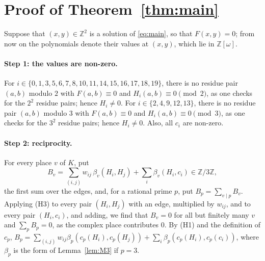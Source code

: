 \documentclass[11pt]{article}
\newcommand{\Z}{\mathbb{Z}}
\begin{document}
\section{Proof of Theorem~\ref{thm:main}}

Suppose that $(x,y)\in\Z^2$ is a solution of \eqref{eq:main}, so that $F(x,y)=0$; from now on the polynomials denote their values at $(x,y)$, which lie in $\Z[\omega]$.
\paragraph{Step 1: the values are non-zero.} For $i\in\{0,\allowbreak 1,\allowbreak 3,\allowbreak 5,\allowbreak 6,\allowbreak 7,\allowbreak 8,\allowbreak 10,\allowbreak 11,\allowbreak 14,\allowbreak 15,\allowbreak 16,\allowbreak 17,\allowbreak 18,\allowbreak 19\}$, there is no residue pair $(a,b)$ modulo $2$ with $F(a,b)\equiv0$ and $H_i(a,b)\equiv0\pmod{2}$, as one checks for the $2^2$ residue pairs; hence $H_i\neq0$. For $i\in\{2,\allowbreak 4,\allowbreak 9,\allowbreak 12,\allowbreak 13\}$, there is no residue pair $(a,b)$ modulo $3$ with $F(a,b)\equiv0$ and $H_i(a,b)\equiv0\pmod{3}$, as one checks for the $3^2$ residue pairs; hence $H_i\neq0$. Also, all $c_i$ are non-zero.

\paragraph{Step 2: reciprocity.} For every place $v$ of $K$, put
\begin{equation}\label{eq:B}
B_v=\sum_{(i,j)}w_{ij}\,\beta_v(H_i,H_j)+\sum_i\beta_v(H_i,c_i)\in\Z/3\Z,
\end{equation}
the first sum over the edges, and, for a rational prime $p$, put $B_p=\sum_{v\mid p}B_v$. Applying (H3) to every pair $(H_i,H_j)$ with an edge, multiplied by $w_{ij}$, and to every pair $(H_i,c_i)$, and adding, we find that $B_v=0$ for all but finitely many $v$ and $\sum_pB_p=0$, as the complex place contributes $0$. By (H1) and the definition of $c_p$, $B_p=\sum_{(i,j)}w_{ij}\beta_p(c_p(H_i),c_p(H_j))+\sum_i\beta_p(c_p(H_i),c_p(c_i))$, where $\beta_p$ is the form of Lemma~\ref{lem:M3} if $p=3$.
\end{document}

